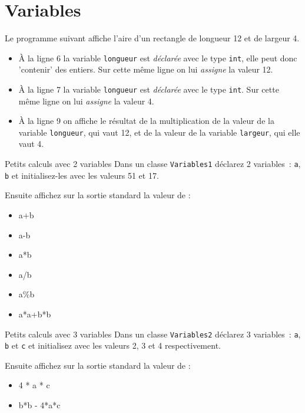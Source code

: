 \documentclass[a4paper,11pt]{article}
\begin{document}
\section{Variables}

	Le programme suivant affiche l'aire d'un rectangle de longueur 12 et de largeur 4.
	

	\begin{itemize}
		\item \`A la ligne 6 la variable \texttt{longueur} est \emph{déclarée} 
			avec le type \texttt{int}, elle peut donc 'contenir' des entiers. 
			Sur cette même ligne on lui \emph{assigne} la valeur 12.  

		\item \`A la ligne 7 la variable \texttt{longueur} est \emph{déclarée} avec le type \texttt{int}. 
			Sur cette même ligne on lui \emph{assigne} la valeur 4.
	
		\item \`A la ligne 9 on affiche le résultat de la multiplication de la valeur de la variable \texttt{longueur}, 
			qui vaut 12, et de la valeur de la variable \texttt{largeur}, qui elle vaut 4.  
  	\end{itemize}



	\begin{Exercice}{Petits calculs avec 2 variables} 		
		Dans un classe \texttt{Variables1} déclarez 2 variables~: 
		\texttt{a}, \texttt{b} et initialisez-les avec les valeurs 51 et 17.
		
		Ensuite affichez sur la sortie standard la valeur de :
		\begin{itemize}
		 	\item a+b
			\item a-b
			\item a*b
			\item a/b
			\item a\%b
			\item a*a+b*b
		\end{itemize} 
	\end{Exercice}

	\begin{Exercice}{Petits calculs avec 3 variables} 
		Dans un classe \texttt{Variables2} déclarez 3 variables~: 
		\texttt{a}, \texttt{b} et \texttt{c} et initialisez avec les valeurs 2, 3 et 4 respectivement.
		
		Ensuite affichez sur la sortie standard la valeur de :
		\begin{itemize}
		 	\item 4 * a * c
			\item b*b - 4*a*c
		\end{itemize} 
	\end{Exercice}
\end{document}

